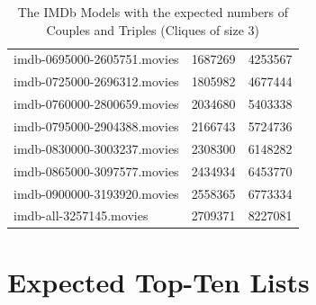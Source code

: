 \documentclass[a4paper,11pt]{article}
\begin{document}
\begin{table}[h!]
\begin{tabular}{| l | r | r |}
  imdb-0695000-2605751.movies & 1687269 & 4253567\\
  imdb-0725000-2696312.movies & 1805982 & 4677444\\
  imdb-0760000-2800659.movies & 2034680 & 5403338\\
  imdb-0795000-2904388.movies & 2166743 & 5724736\\
  imdb-0830000-3003237.movies & 2308300 & 6148282\\
  imdb-0865000-3097577.movies & 2434934 & 6453770\\
  imdb-0900000-3193920.movies & 2558365 & 6773334\\
  imdb-all-3257145.movies     & 2709371 & 8227081\\
  \hline
\end{tabular}
\caption{The IMDb Models with the expected numbers of Couples and Triples (Cliques of size 3)}
\label{tab:imdb-numbers}
\end{table}

\section{Expected Top-Ten Lists}
\label{sec:expected-top-ten}
\end{document}
